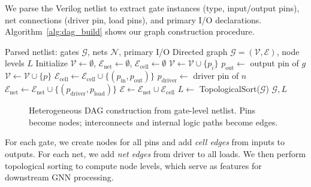 \documentclass[10pt,twocolumn,journal]{IEEEtran}
\begin{document}
We parse the Verilog netlist to extract gate instances (type, input/output pins), net connections (driver pin, load pins), and primary I/O declarations. Algorithm~\ref{alg:dag_build} shows our graph construction procedure.

\begin{algorithm}[t]
\caption{Heterogeneous DAG Construction}
\label{alg:dag_build}
\begin{algorithmic}[1]
\REQUIRE Parsed netlist: gates $\mathcal{G}$, nets $\mathcal{N}$, primary I/O
\ENSURE Directed graph $\mathcal{G} = (\mathcal{V}, \mathcal{E})$, node levels $L$
\STATE Initialize $\mathcal{V} \leftarrow \emptyset$, $\mathcal{E}_{\text{net}} \leftarrow \emptyset$, $\mathcal{E}_{\text{cell}} \leftarrow \emptyset$
    \STATE $\mathcal{V} \leftarrow \mathcal{V} \cup \{p_i\}$
\ENDFOR
{}
    \STATE $p_{\text{out}} \leftarrow$ output pin of $g$  
        \STATE $\mathcal{V} \leftarrow \mathcal{V} \cup \{p\}$
    \ENDFOR
        \STATE $\mathcal{E}_{\text{cell}} \leftarrow \mathcal{E}_{\text{cell}} \cup \{(p_{\text{in}}, p_{\text{out}})\}$ 
    \ENDFOR
\ENDFOR
{}
    \STATE $p_{\text{driver}} \leftarrow$ driver pin of $n$
        \STATE $\mathcal{E}_{\text{net}} \leftarrow \mathcal{E}_{\text{net}} \cup \{(p_{\text{driver}}, p_{\text{load}})\}$
    \ENDFOR
\ENDFOR
\STATE $\mathcal{E} \leftarrow \mathcal{E}_{\text{net}} \cup \mathcal{E}_{\text{cell}}$
\STATE $L \leftarrow$ TopologicalSort($\mathcal{G}$) 
\RETURN $\mathcal{G}, L$
\end{algorithmic}
\end{algorithm}

\begin{figure}[t]
\centering
{}
\caption{Heterogeneous DAG construction from gate-level netlist. Pins become nodes; interconnects and internal logic paths become edges.}
\label{fig:graph_construction}
\end{figure}

For each gate, we create nodes for all pins and add \textit{cell edges} from inputs to outputs. For each net, we add \textit{net edges} from driver to all loads. We then perform topological sorting to compute node levels, which serve as features for downstream GNN processing.
\end{document}
